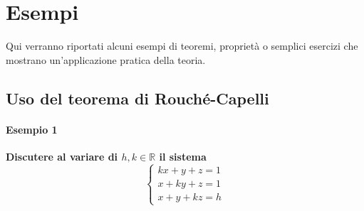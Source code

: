 
\section{Esempi}%
\label{sec:esempi}

Qui verranno riportati alcuni esempi di teoremi, proprietà o semplici esercizi che
mostrano un'applicazione pratica della teoria.

\subsection{}%

\subsection{}%

\subsection{Uso del teorema di Rouché-Capelli}%
\label{sub:uso_del_teorema_di_rouche_capelli}

\paragraph{Esempio 1}%
\textbf{Discutere al variare di $h,k\in\mathbb{R}$ il sistema}
\begin{equation*}
  \begin{cases}
    kx + y + z = 1\\
    x + ky + z = 1\\
    x + y + kz = h
  \end{cases}
\end{equation*}

